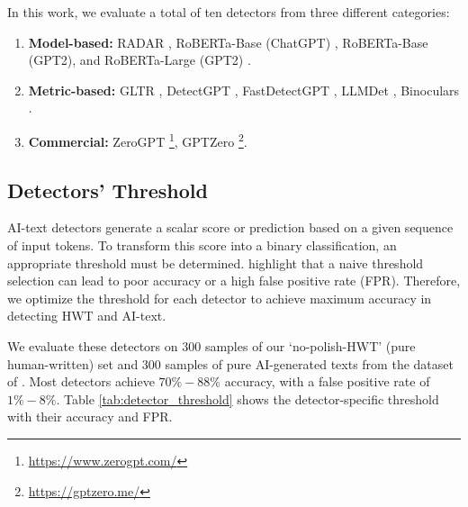 In this work, we evaluate a total of ten detectors from three different categories: 
\begin{enumerate}
    \item \textbf{Model-based:} RADAR \citep{hu2023radar}, RoBERTa-Base (ChatGPT) \citep{guo-etal-2023-hc3}, RoBERTa-Base (GPT2), and RoBERTa-Large (GPT2) \citep{gpt2OutputDataset}.
    
    \item \textbf{Metric-based:} GLTR \citep{gehrmann2019gltr}, DetectGPT \citep{mitchell2023detectgpt}, FastDetectGPT \citep{bao2023fast}, LLMDet \citep{wu2023llmdet}, Binoculars \citep{hans2024spotting}.
    \item \textbf{Commercial:} ZeroGPT \footnote{\url{https://www.zerogpt.com/}}, GPTZero \footnote{\url{https://gptzero.me/}}.
\end{enumerate}

\subsection{Detectors' Threshold}
AI-text detectors generate a scalar score or prediction based on a given sequence of input tokens. To transform this score into a binary classification, an appropriate threshold must be determined. \citet{dugan2024raid} highlight that a naive threshold selection can lead to poor accuracy or a high false positive rate (FPR). Therefore, we optimize the threshold for each detector to achieve maximum accuracy in detecting HWT and AI-text.

We evaluate these detectors on $300$ samples of our `no-polish-HWT' (pure human-written) set and $300$ samples of pure AI-generated texts from the dataset of \citet{zhang2024llm}. Most detectors achieve $70\% - 88\%$ accuracy, with a false positive rate of $1\% - 8\%$. Table \ref{tab:detector_threshold} shows the detector-specific threshold with their accuracy and FPR.

